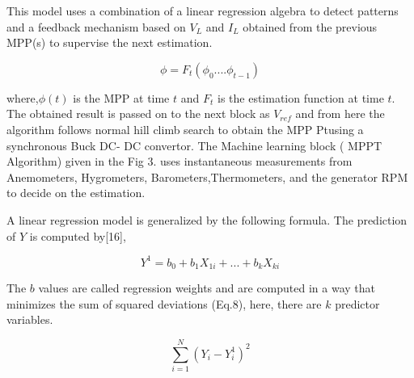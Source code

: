 This model uses a combination of a linear regression algebra to detect patterns and a feedback mechanism based on $V_L$ and $I_L$ obtained from the previous MPP(s) to supervise the next estimation.


\begin{equation}
\phi =F_t( \phi_0 .... \phi_{t-1}) 
\end{equation}

where,$\phi(t)$ is the MPP at time $t$  and $F_t$ is the estimation function at time $t$.  The obtained result is  passed on to the next block as $V_{ref}$ and from here the algorithm follows normal hill climb search to obtain the MPP Ptusing a synchronous Buck DC- DC convertor.  The Machine learning block ( MPPT Algorithm) given in the Fig 3. uses  instantaneous measurements from Anemometers, Hygrometers, Barometers,Thermometers, and the generator RPM to decide on the estimation. 

A linear regression model is generalized by the following formula. The prediction of $Y$ is computed by[16],


\begin{equation}
Y^1= b_0 + b_1 X_{1i} + ... + b_k X_{ki}
\end{equation}

The $b$ values are called regression weights and are computed in a way that minimizes the sum of squared deviations (Eq.8), here, there are $k$ predictor variables.


\begin{equation}
\sum_{i= 1 }^{N} (Y_i - Y^1_i)^2
\end{equation}

